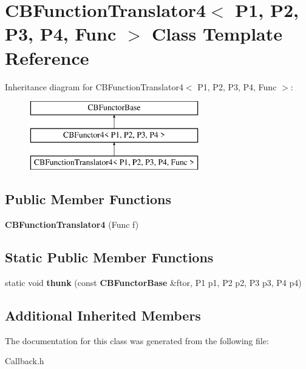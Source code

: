 \section{C\+B\+Function\+Translator4$<$ P1, P2, P3, P4, Func $>$ Class Template Reference}
\label{classCBFunctionTranslator4}
Inheritance diagram for C\+B\+Function\+Translator4$<$ P1, P2, P3, P4, Func $>$\+:\begin{figure}[H]
\begin{center}
\leavevmode
\includegraphics[height=3.000000cm]{classCBFunctionTranslator4}
\end{center}
\end{figure}
\subsection*{Public Member Functions}
\begin{DoxyCompactItemize}
\item 
{\bfseries C\+B\+Function\+Translator4} (Func f)\label{classCBFunctionTranslator4_ae810433e97712ca1cc6fc0f45d49dc31}

\end{DoxyCompactItemize}
\subsection*{Static Public Member Functions}
\begin{DoxyCompactItemize}
\item 
static void {\bfseries thunk} (const {\bf C\+B\+Functor\+Base} \&ftor, P1 p1, P2 p2, P3 p3, P4 p4)\label{classCBFunctionTranslator4_aca29fc798d6345156a1375d66713dc96}

\end{DoxyCompactItemize}
\subsection*{Additional Inherited Members}


The documentation for this class was generated from the following file\+:\begin{DoxyCompactItemize}
\item 
Callback.\+h\end{DoxyCompactItemize}
